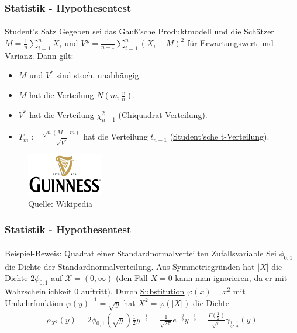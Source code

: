 \documentclass{beamer}
\begin{document}
\begin{frame}
    \frametitle{Statistik - Hypothesentest}
\framesubtitle{}

\begin{block}{Student's Satz}
Gegeben sei das Gauß'sche Produktmodell und die Schätzer $M =  \frac{1}{n} \sum_{i= 1}^n X_i$ und $V* = \frac{1}{n-1} \sum_{i= 1}^n (X_i - M)^2$ für Erwartungswert und Varianz. Dann gilt:
\begin{itemize}
\item $M$ und $V^*$ sind stoch. unabhängig.
\item $M$ hat die Verteilung $N(m ,\frac{v}{n})$.
\item $V^*$ hat die Verteilung $\chi^2_{n-1}$ (\href{https://de.wikipedia.org/wiki/Chi-Quadrat-Verteilung}{\underline{Chiquadrat-Verteilung}}).
\item $T_m := \frac{\sqrt{n}(M-m)}{\sqrt{V^*}}$ hat die Verteilung $t_{n-1}$ (\href{https://de.wikipedia.org/wiki/Studentsche_t-Verteilung}{\underline{Student'sche t-Verteilung}}).
\end{itemize}
\end{block}
\begin{figure}[htp]
      \centering
    \includegraphics[width=0.3\textwidth]{img/Guinness}

      \caption{Quelle: Wikipedia}
\end{figure}


 \end{frame}

\begin{frame}
    \frametitle{Statistik - Hypothesentest}
\framesubtitle{}

\begin{block}{Beispiel-Beweis: Quadrat einer Standardnormalverteilten Zufallsvariable}
Sei $\phi_{0,1}$ die Dichte der Standardnormalverteilung.
Aus Symmetriegründen hat $|X|$ die Dichte $2 \phi_{0,1}$ auf $\mathcal{X} = (0, \infty)$ (den Fall $X=0$ kann man ignorieren, da er mit Wahrscheinlichkeit $0$ auftritt). Durch \href{https://de.wikipedia.org/wiki/Integration_durch_Substitution}{\underline{Substitution}}    $\varphi(x)= x^2$ mit Umkehrfunktion $\varphi(y)^{-1} = \sqrt{y}$ hat $X^2 = \varphi(|X|)$ die Dichte
\begin{align*}
\rho_{X^2} (y) = 2 \phi_{0,1}(\sqrt{y}) \frac{1}{2}y^{-\frac{1}{2}} = \frac{1}{\sqrt{2 \pi}} e^{-\frac{y}{2}} y^{-\frac{1}{2}} = \frac{\Gamma(\frac{1}{2})}{\sqrt{\pi}} \gamma_{\frac{1}{2}, \frac{1}{2}} (y)
\end{align*}
\end{block}
 \end{frame}
\end{document}
